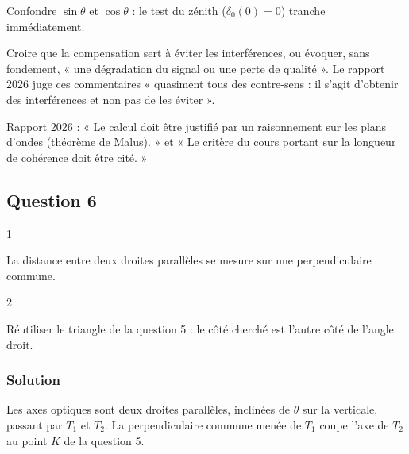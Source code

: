\documentclass[11pt,a4paper]{article}
\begin{document}
\begin{piege}

Confondre \(\sin\theta\) et \(\cos\theta\) : le test du zénith (\(\delta_0(0)=0\)) tranche immédiatement.

\end{piege}

\begin{piege}

Croire que la compensation sert à éviter les interférences, ou évoquer, sans fondement, « une dégradation du signal ou une perte de qualité ». Le rapport 2026 juge ces commentaires « quasiment tous des contre-sens : il s'agit d'obtenir des interférences et non pas de les éviter ».

\end{piege}

\begin{jury}

Rapport 2026 : « Le calcul doit être justifié par un raisonnement sur les plans d'ondes (théorème de Malus). » et « Le critère du cours portant sur la longueur de cohérence doit être cité. »

\end{jury}

\hypertarget{question-6}{%
\subsection{Question 6}\label{question-6}}

\begin{indication}{1}

La distance entre deux droites parallèles se mesure sur une perpendiculaire commune.

\end{indication}

\begin{indication}{2}

Réutiliser le triangle de la question 5 : le côté cherché est l'autre côté de l'angle droit.

\end{indication}

\hypertarget{solution-5}{%
\subsubsection{Solution}\label{solution-5}}

Les axes optiques sont deux droites parallèles, inclinées de \(\theta\) sur la verticale, passant par \(T_1\) et \(T_2\). La perpendiculaire commune menée de \(T_1\) coupe l'axe de \(T_2\) au point \(K\) de la question 5.
\end{document}

